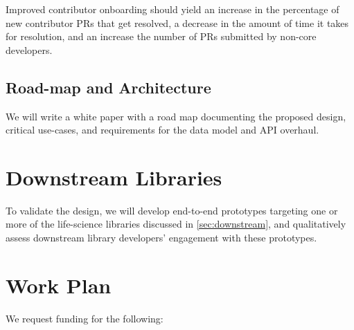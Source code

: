 \documentclass[11pt,letterpaper]{article}  %
\begin{document}
Improved contributor onboarding should yield an increase in the percentage of new contributor PRs that get resolved, a decrease in the amount of time it takes for resolution, and an increase the number of PRs submitted by non-core developers.


\subsection{Road-map and Architecture}

We will write a white paper with a road map documenting the proposed design, critical use-cases, and requirements for the data model and API overhaul.


\section{Downstream Libraries}
To validate the design, we will develop end-to-end prototypes targeting one or more of the life-science libraries discussed in \ref{sec:downstream}, and qualitatively assess downstream library developers' engagement with these prototypes.

\section{Work Plan}

We request funding for the following:
\end{document}
